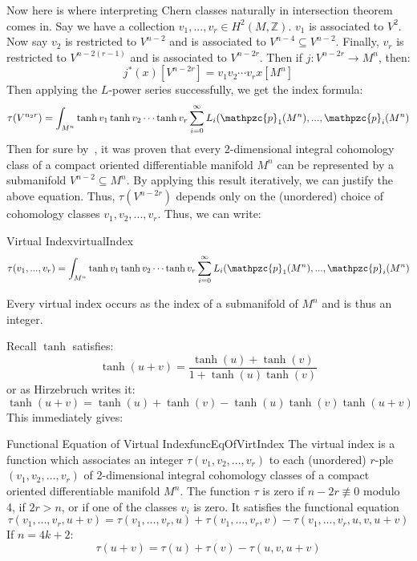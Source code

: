 \documentclass{ut-thesis}
\newcommand{\Z}{{\mathbb{Z}}}
\newcommand{\cp}{{\mathpzc{p}}}
\newcommand{\sse}{\subseteq}
\begin{document}
Now here is where interpreting Chern classes naturally in intersection theorem comes in. Say we have
a collection $v_1, ..., v_r \in H^2(M, \Z)$. $v_1$ is associated to $V^2$. Now say $v_2$ is restricted to $V^{n-2}$ and
is associated to $V^{n-4} \sse V^{n-2}$. Finally, $v_r$ is restricted to $V^{n-2(r-1)}$ and is associated to
$V^{n-2r}$. Then if $j: V^{n-2r} \to M^n$, then:
\[
  j^*(x)[V^{n-2r}] = v_1v_2\cdots v_rx[M^n]
\]
Then applying the $L$-power series successfully, we get the index formula:
\[
  \tau(V^{n_2r}) = \int_{M^n} \tanh v_1\tanh v_2 \cdots \tanh v_r \sum_{i=0}^\infty L_i(\cp_1(M^n), ...,
  \cp_i(M^n)
\]
Then for sure by~\cite{NateKTheory}, it was proven that every $2$-dimensional integral cohomology class of
a compact oriented differentiable manifold $M^n$ can be represented by a submanifold $V^{n-2} \sse M^n$. By
applying this result iteratively, we can justify the above equation. Thus, $\tau(V^{n-2r})$ depends only on
the (unordered) choice of cohomology classes $v_1,v_2, ..., v_r$. Thus, we can write:
\begin{defn}{Virtual Index}{virtualIndex}
\[
  \tau(v_1, ..., v_r) = \int_{M^n} \tanh v_1\tanh v_2 \cdots \tanh v_r \sum_{i=0}^\infty L_i(\cp_1(M^n), ...,
  \cp_i(M^n)
\]
\end{defn}

Every virtual index occurs as the index of a submanifold of $M^n$ and is thus an integer.

Recall $\tanh$ satisfies:
\[
  \tanh(u+v) = \frac{\tanh(u) + \tanh(v)}{1  +\tanh(u)\tanh(v)}
\]
or as Hirzebruch writes it:
\[
  \tanh(u+v) = \tanh(u) + \tanh(v) - \tanh(u)\tanh(v)\tanh(u+v)
\]
This immediately gives:

\begin{thm}{Functional Equation of Virtual Index}{funcEqOfVirtIndex}
The virtual index is a function which associates an integer $\tau(v_1, v_2, \ldots, v_r)$ to each (unordered)
$r$-ple $(v_1, v_2, \ldots, v_r)$ of 2-dimensional integral cohomology classes of a compact oriented
differentiable manifold $M^n$. The function $\tau$ is zero if $n-2r \not\equiv 0$ modulo 4, if $2r > n$, or if
one of the classes $v_i$ is zero. It satisfies the functional equation
\[
    \tau(v_1,\ldots,v_r,u+v) = \tau(v_1,\ldots,v_r,u) + \tau(v_1,\ldots,v_r,v) - \tau(v_1,\ldots,v_r,u,v,u+v)
\]
If $n = 4k+2$:
\[
  \tau(u+v) = \tau(u) + \tau(v) - \tau(u,v,u+v)
\]
\end{thm}

\end{document}
